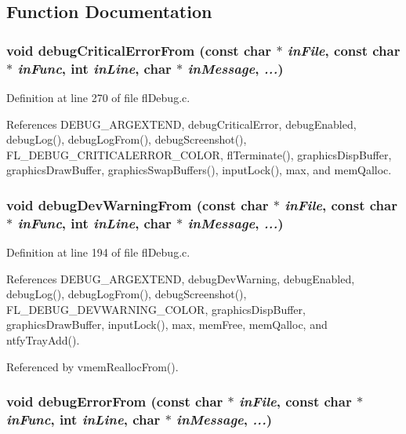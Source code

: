 \subsection{Function Documentation}
\subsubsection{\setlength{\rightskip}{0pt plus 5cm}void debug\-Critical\-Error\-From (const char $\ast$ {\em in\-File}, const char $\ast$ {\em in\-Func}, int {\em in\-Line}, char $\ast$ {\em in\-Message},  {\em ...})}\label{flDebug_8h_f7b8726be0c7d77f33f037efc03f06cf}




Definition at line 270 of file fl\-Debug.c.

References DEBUG\_\-ARGEXTEND, debug\-Critical\-Error, debug\-Enabled, debug\-Log(), debug\-Log\-From(), debug\-Screenshot(), FL\_\-DEBUG\_\-CRITICALERROR\_\-COLOR, fl\-Terminate(), graphics\-Disp\-Buffer, graphics\-Draw\-Buffer, graphics\-Swap\-Buffers(), input\-Lock(), max, and mem\-Qalloc.
\subsubsection{\setlength{\rightskip}{0pt plus 5cm}void debug\-Dev\-Warning\-From (const char $\ast$ {\em in\-File}, const char $\ast$ {\em in\-Func}, int {\em in\-Line}, char $\ast$ {\em in\-Message},  {\em ...})}\label{flDebug_8h_4d07cff8a1476a26ecd6e675bb0cbe8f}




Definition at line 194 of file fl\-Debug.c.

References DEBUG\_\-ARGEXTEND, debug\-Dev\-Warning, debug\-Enabled, debug\-Log(), debug\-Log\-From(), debug\-Screenshot(), FL\_\-DEBUG\_\-DEVWARNING\_\-COLOR, graphics\-Disp\-Buffer, graphics\-Draw\-Buffer, input\-Lock(), max, mem\-Free, mem\-Qalloc, and ntfy\-Tray\-Add().

Referenced by vmem\-Realloc\-From().
\subsubsection{\setlength{\rightskip}{0pt plus 5cm}void debug\-Error\-From (const char $\ast$ {\em in\-File}, const char $\ast$ {\em in\-Func}, int {\em in\-Line}, char $\ast$ {\em in\-Message},  {\em ...})}\label{flDebug_8h_71fe856a9d6b43b341ca87a8395b3120}




